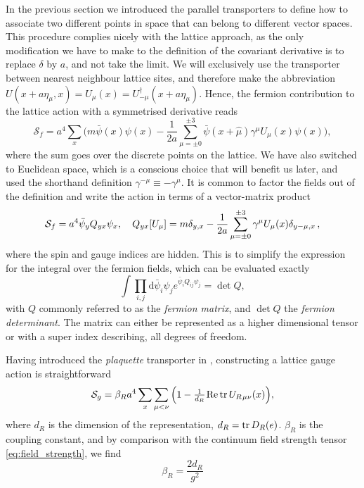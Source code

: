 In the previous section we introduced the parallel transporters to define how to
associate two different points in space that can belong to different vector
spaces. This procedure complies nicely with the lattice approach, as the only modification we
have to make to the definition of the covariant derivative is to
replace $\delta$ by $a$, and not take the limit. We will exclusively use the
transporter between nearest neighbour lattice sites, and therefore make the
abbreviation $U(x + a \eta_\mu, x) = U_{\mu}(x) =
U_{-\mu}^{\dagger}(x+a\eta_{\mu})$. Hence, the fermion contribution to the
lattice action with a symmetrised derivative reads
%
\begin{equation} \label{eq:naive_fermions}
  \mathcal{S}_f = a^4 \sum_x \Big( 
    m \bar{\psi}(x)\psi(x) - 
    \frac{1}{2a}\sum_{\mu=\pm 0}^{\pm 3}
    \bar{\psi}(x+\hat{\mu})\gamma^{\mu}U_{\mu}(x) \psi(x) \bigg),
\end{equation}
%
where the sum goes over the discrete points on the lattice. We have also
switched to Euclidean space, which is a conscious choice that will benefit us
later, and used the shorthand definition $\gamma^{-\mu} \equiv -\gamma^{\mu}$.
It is common to factor the fields out of the definition and write the action in
terms of a vector-matrix product
%
\begin{equation}
  \mathcal{S}_f = a^4 \bar{\psi}_y Q_{yx} \psi_x, \hskip1em 
  Q_{yx}[U_{\mu}] = m \delta_{y,x} - \frac{1}{2a} \sum_{\mu=\pm 0}^{\pm 3} \gamma^{\mu}
    U_{\mu}(x) \delta_{y-\mu,x} \,,
\end{equation}
%
where the spin and gauge indices are hidden.  This is to simplify the expression
for the integral over the fermion fields, which can be evaluated exactly
%
\begin{equation} \label{eq:fermion-integral}
  \int \prod_{i,j} \mathrm{d} \bar{\psi}_i \psi_j e^{\bar{\psi}_i Q_{ij} \psi_j}
   = \det Q,
\end{equation}
%
with $Q$ commonly referred to as the \emph{fermion matrix}, and $\det Q$ the
\emph{fermion determinant}. The matrix can either be represented as a higher
dimensional tensor or with a super index describing, all degrees of freedom.

Having introduced the \emph{plaquette} transporter in
, constructing a lattice gauge action is
straightforward
%
\begin{equation}
  \mathcal{S}_g = \beta_R a^4 \sum_x \sum_{\mu < \nu} \Big( 1 -
    \textstyle\frac{1}{d_R} \hskip.2ex \text{Re} \operatorname{tr} U_{R \hskip.2ex\mu\nu}(x) \Big),
\end{equation}
%
where $d_R$ is the dimension of the representation, $d_R = \operatorname{tr} D_R(e)$. $\beta_R$ is the
coupling constant, and by comparison with the continuum field strength tensor
\eqref{eq:field_strength}, we find
%
\begin{equation}
  \beta_R = \frac{2 d_R}{g^2}
\end{equation}

